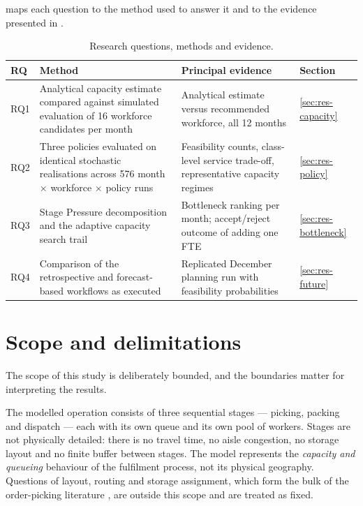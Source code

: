  maps each question to the method used to answer it and to the evidence
presented in .

\begin{table}[htbp]
\centering
\caption{Research questions, methods and evidence.}
\label{tab:rq-map}
\small
\begin{tabularx}{\textwidth}{lXXl}
\toprule
\textbf{RQ} & \textbf{Method} & \textbf{Principal evidence} & \textbf{Section} \\
\midrule
RQ1 & Analytical capacity estimate compared against simulated evaluation of 16 workforce
      candidates per month & Analytical estimate versus recommended workforce, all 12 months
      & \ref{sec:res-capacity} \\
RQ2 & Three policies evaluated on identical stochastic realisations across 576 month
      \(\times\) workforce \(\times\) policy runs & Feasibility counts, class-level service
      trade-off, representative capacity regimes & \ref{sec:res-policy} \\
RQ3 & Stage Pressure decomposition and the adaptive capacity search trail & Bottleneck ranking
      per month; accept/reject outcome of adding one FTE & \ref{sec:res-bottleneck} \\
RQ4 & Comparison of the retrospective and forecast-based workflows as executed & Replicated
      December planning run with feasibility probabilities & \ref{sec:res-future} \\
\bottomrule
\end{tabularx}
\end{table}

\section{Scope and delimitations}
\label{sec:scope}

The scope of this study is deliberately bounded, and the boundaries matter for interpreting
the results.

The modelled operation consists of three sequential stages --- picking, packing and dispatch
--- each with its own queue and its own pool of workers. Stages are not physically detailed:
there is no travel time, no aisle congestion, no storage layout and no finite buffer between
stages. The model represents the \emph{capacity and queueing} behaviour of the fulfilment
process, not its physical geography. Questions of layout, routing and storage assignment, which
form the bulk of the order-picking literature \citep{dekoster2007,weidinger2019}, are outside
this scope and are treated as fixed.

